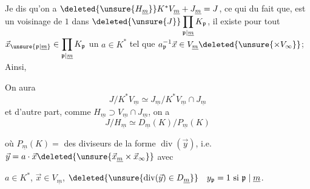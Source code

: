 Je dis qu'on a $\deleted{\unsure{H_{\underline m}}}K^*V_{\underline m}+J_{\underline m}=J$, ce qui  du fait que,   est un voisinage de $1$ dans $\deleted{\unsure{J}}\displaystyle\prod_{\mathfrak p\mid\underline m}K_{\mathfrak p}$, il existe pour tout $\vec x_{\unsure{\mathfrak p|\underline m}}\in\displaystyle\prod_{\mathfrak p\mid\underline m}K_{\mathfrak p}$ un $a\in K^*$ tel que $a_{\mathfrak p}^{-1}\vec x\in V_{\underline m}\deleted{\unsure{\times V_\infty}}$; Ainsi,

On aura
\[
J/K^*V_{\underline m}\simeq J_{\underline m}/K^*V_{\underline m}\cap J_{\underline m}
\]
 et  d'autre part, comme $H_{\underline m}\supset V_{\underline m}\cap J_{\underline m}$,  on a
\[
J/H_{\underline m}\simeq D_{\underline m}(K)/P_{\underline m}(K)
\]

où $P_{\underline m}(K)=$  des diviseurs   de la forme $\operatorname{div}(\vec y)$, i.e. $\vec y=a\cdot\vec x\deleted{\unsure{\vec x_{\underline m}\times\vec x_\infty}}$ avec


$a\in K^*$, $\vec x\in V_{\underline m}$, $\deleted{\unsure{\operatorname{div}(\vec y)\in D_{\underline m}}}\quad y_{\mathfrak p}=1\text{ si }\mathfrak p\mid\underline m$.

